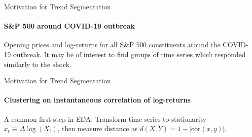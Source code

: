 \documentclass{beamer}
\begin{document}

\begin{frame}{Motivation for Trend Segmentation}
\framesubtitle{S\&P 500 around COVID-19 outbreak}

Opening prices and log-returns for all S\&P 500 constituents around the COVID-19 outbreak. It may be of interest to find groups of time series which responded similarly to the shock.

\begin{figure}[H]
    \centering
    \begin{subfigure}
        \texttt{[image: ../plots/SnP500\_raw\_COVID.png]}
    \end{subfigure}
    \begin{subfigure}
        \texttt{[image: ../plots/SnP500\_LR\_COVID.png]}
    \end{subfigure}
\end{figure}

\end{frame}




\begin{frame}{Motivation for Trend Segmentation}
\framesubtitle{Clustering on instantaneous correlation of log-returns}

A common first step in EDA. Transform time series to stationarity $x_t \equiv \Delta \log \left ( X_t \right )$, then measure distance as $d(X,Y) = 1-\left | \text{cor} \left ( x,y \right ) \right |$.

\begin{figure}
    \centering
    \begin{subfigure}
        \texttt{[image: ../plots/SnP500\_cor\_similar.png]}
    \end{subfigure}
        \begin{subfigure}
        \texttt{[image: ../plots/SnP500\_random\_selection.png]}
    \end{subfigure}
        \begin{subfigure}
        \texttt{[image: ../plots/SnP500\_cor\_dissimilar.png]}
    \end{subfigure}
\end{figure}
    
\end{frame}



\end{document}
